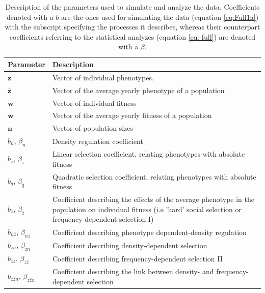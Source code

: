 \documentclass{article}
\begin{document}
\begin{table} [h]
	\begin{singlespace}
		\begin{tabular}{|l|p{13cm}|} 
			\hline
			
			Parameter & Description \\ 
			\hline
			$\bm{z}$        & Vector of individual phenotypes. \\ 
			$\bar{\bm{z}}$  & Vector of the average yearly phenotype of a population\\ 
			$\bm{w}$        & Vector of individual fitness \\ 
			$\bar{\bm{w}}$  & Vector of the average yearly fitness of a population\\ 
			$\bm{n}$        & Vector of population sizes \\ 
			$b_n$, $\beta_n$              & Density regulation coefficient \\ 
			$b_z$, $\beta_z$              & Linear selection coefficient, relating phenotypes with absolute fitness \\ 
			$b_q$, $\beta_q$              & Quadratic selection coefficient, relating phenotypes with absolute fitness \\ 
			$b_{\bar{z}}$, $\beta_{\bar{z}}$      & Coefficient describing the effects of the average phenotype in the population on individual fitness (i.e 'hard' social selection or frequency-dependent selection I) \\ 
			$b_{n\bar{z}}$, $\beta_{n\bar{z}}$     & Coefficient describing phenotype dependent-density regulation \\ 
			$b_{zn}$, $\beta_{zn}$           & Coefficient describing density-dependent selection \\ 
			$b_{z\bar{z}}$, $\beta_{z\bar{z}}$     & Coefficient describing frequency-dependent selection II \\ 
			$b_{z\bar{z}n}$, $\beta_{z\bar{z}n}$    & Coefficient describing the link between density- and frequency-dependent selection\\ 
			\hline
		\end{tabular}
		\caption{Description of the parameters used to simulate and analyze the data. Coefficients denoted with a $b$ are the ones used for simulating the data (equation \ref{eq:Full1a}) with the subscript specifying the processes it describes, whereas their counterpart coefficients referring to the statistical analyzes (equation \ref{eq: full}) are denoted with a $\beta$.}
	\end{singlespace}
\end{table}
\end{document}
